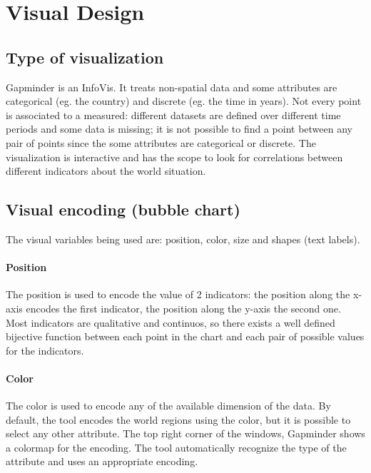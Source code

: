 \section{Visual Design}
\label{sec:visual_design}

\subsection{Type of visualization}
Gapminder is an InfoVis.
It treats non-spatial data and some attributes are categorical (eg. the country) and discrete (eg. the time in years).
Not every point is associated to a measured: different datasets are defined over different time periods and some data is missing; it is not possible to find a point between any pair of points since the some attributes are categorical or discrete.
The visualization is interactive and has the scope to look for correlations between different indicators about the world situation.

\subsection{Visual encoding (bubble chart)}
The visual variables being used are: position, color, size and shapes (text labels).

\paragraph{Position}
The position is used to encode the value of \num{2} indicators: the position along the x-axis encodes the first indicator, the position along the y-axis the second one.
Most indicators are qualitative and continuos, so there exists a well defined bijective function between each point in the chart and each pair of possible values for the indicators.


\paragraph{Color}
The color is used to encode any of the available dimension of the data.
By default, the tool encodes the world regions using the color, but it is possible to select any other attribute.
The top right corner of the windows, Gapminder shows a colormap for the encoding.
The tool automatically recognize the type of the attribute and uses an appropriate encoding.

